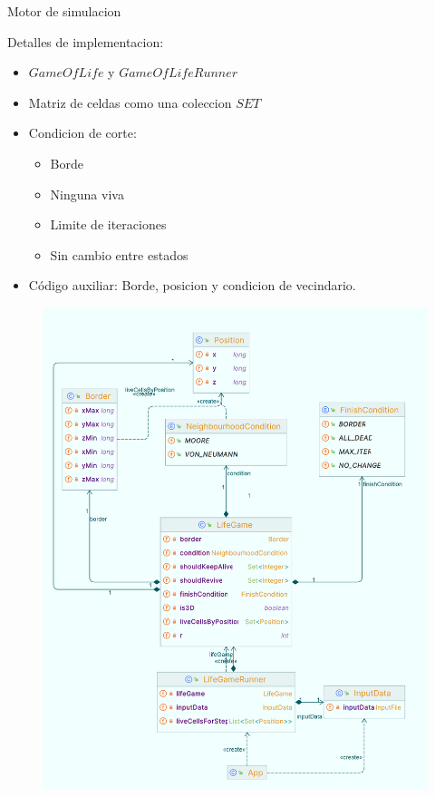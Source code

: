\begin{frame}{Motor de simulacion}


    \begin{minipage}[t]{0.55\linewidth}
        \begin{block}{Detalles de implementacion:}
            \begin{itemize}
                \item $GameOfLife$ y $GameOfLifeRunner$
                \item Matriz de celdas como una coleccion $SET$
                \item Condicion de corte:
                    \begin{itemize}
                        \item Borde
                        \item Ninguna viva
                        \item Limite de iteraciones
                        \item Sin cambio entre estados
                    \end{itemize}
                \item Código auxiliar: Borde, posicion y condicion de vecindario.
            \end{itemize}
        \end{block}
    \end{minipage}%
    \hfill%
    \begin{minipage}[t]{0.4\linewidth}
        \begin{figure}[H]
            \centering
            \includegraphics[width=0.9\linewidth]{pic/03-implementacion/UML_side}
        \end{figure}
    \end{minipage}
\end{frame}

